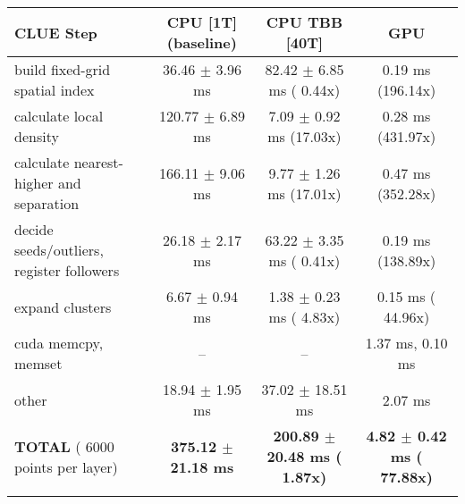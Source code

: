    \begin{tabular}{l|c|c|c}
    \hline
    CLUE Step                                 & CPU [1T] (baseline)         & CPU TBB [40T]                         & GPU                       \\ \hline
    build fixed-grid spatial index            &  36.46 $\pm$  3.96 ms       &  82.42 $\pm$  6.85 ms ( 0.44x)        &   0.19 ms (196.14x)       \\
    calculate local density                   & 120.77 $\pm$  6.89 ms       &   7.09 $\pm$  0.92 ms (17.03x)        &   0.28 ms (431.97x)       \\
    calculate nearest-higher and separation   & 166.11 $\pm$  9.06 ms       &   9.77 $\pm$  1.26 ms (17.01x)        &   0.47 ms (352.28x)       \\
    decide seeds/outliers, register followers &  26.18 $\pm$  2.17 ms       &  63.22 $\pm$  3.35 ms ( 0.41x)        &   0.19 ms (138.89x)       \\
    expand clusters                           &   6.67 $\pm$  0.94 ms       &   1.38 $\pm$  0.23 ms ( 4.83x)        &   0.15 ms ( 44.96x)       \\ \hline
    cuda memcpy, memset                       & --                          & --                                    &   1.37 ms,   0.10 ms      \\ 
    other                                     &  18.94 $\pm$  1.95 ms       &  37.02 $\pm$ 18.51 ms                 &   2.07 ms                 \\ \hline
    \textbf{TOTAL} ( 6000 points per layer)   & \textbf{375.12 $\pm$ 21.18 ms} & \textbf{200.89 $\pm$ 20.48 ms ( 1.87x)} & \textbf{  4.82 $\pm$  0.42 ms ( 77.88x)}  \\
    \hline
    \multicolumn{4}{c}{} 
    \end{tabular}
    \linebreak


